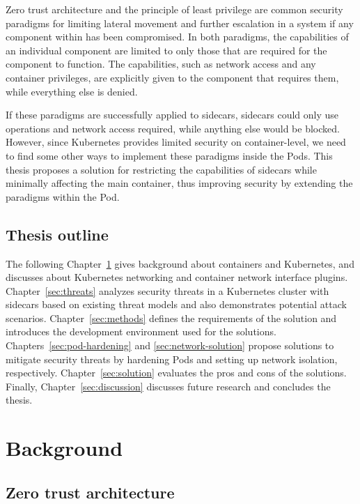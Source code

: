 \documentclass[english, 12pt, a4paper, sci, utf8, a-2b, online]{aaltothesis}
\begin{document}
Zero trust architecture and the principle of least privilege are common security paradigms for limiting lateral movement and further escalation in a system if any component within has been compromised.
In both paradigms, the capabilities of an individual component are limited to only those that are required for the component to function.
The capabilities, such as network access and any container privileges, are explicitly given to the component that requires them, while everything else is denied.

If these paradigms are successfully applied to sidecars, sidecars could only use operations and network access required, while anything else would be blocked.
However, since Kubernetes provides limited security on container-level, we need to find some other ways to implement these paradigms inside the Pods.
This thesis proposes a solution for restricting the capabilities of sidecars while minimally affecting the main container, thus improving security by extending the paradigms within the Pod.

\subsection{Thesis outline}

The following Chapter~\ref{sec:bg} gives background about containers and Kubernetes, and discusses about Kubernetes networking and container network interface plugins.
Chapter~\ref{sec:threats} analyzes security threats in a Kubernetes cluster with sidecars based on existing threat models and also demonstrates potential attack scenarios.
Chapter~\ref{sec:methods} defines the requirements of the solution and introduces the development environment used for the solutions.
Chapters~\ref{sec:pod-hardening} and \ref{sec:network-solution} propose solutions to mitigate security threats by hardening Pods and setting up network isolation, respectively.
Chapter~\ref{sec:solution} evaluates the pros and cons of the solutions.
Finally, Chapter~\ref{sec:discussion} discusses future research and concludes the thesis.

\clearpage

\section{Background} \label{sec:bg}

\subsection{Zero trust architecture}
\end{document}
